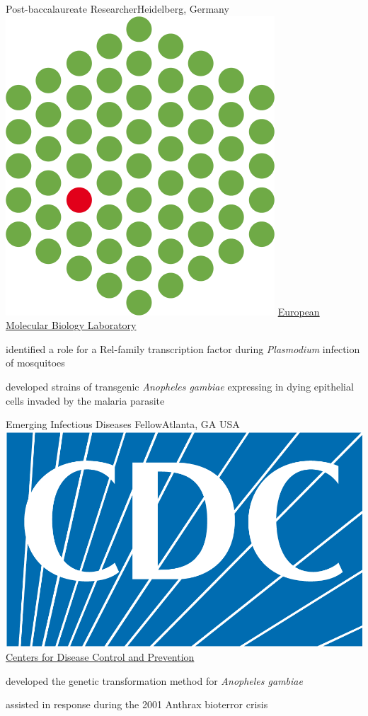 \documentclass[letterpaper]{twentysecond-charactersheet}
\begin{document}
%
	{Post-baccalaureate Researcher}{Heidelberg, Germany}%
	{\includegraphics[width=\logowidth]{img/EMBL.png}}%
	{\href{http://www.embl.de/}{European Molecular Biology Laboratory}}%
	{\begin{itemize}
			{\item[\color{gold}\faStar] identified a role for a Rel-family transcription factor during \emph{Plasmodium} infection of mosquitoes}
		\end{itemize}
		\begin{itemize}
			{\item developed strains of transgenic \emph{Anopheles gambiae} expressing  in dying epithelial cells invaded by the malaria parasite}
		\end{itemize}
	}

	{Emerging Infectious Diseases Fellow}{Atlanta, GA USA}
	{\includegraphics[width=\logowidth]{img/CDC.png}}%
	{\href{http://www.cdc.gov/}{Centers for Disease Control and Prevention}}
	{\begin{itemize}
			{\item[\color{gold-metallic}\faTrophy] developed the genetic transformation method for \emph{Anopheles gambiae}}
		\end{itemize}
		\begin{itemize}
			{\item assisted in  response during the 2001 Anthrax bioterror crisis}
		\end{itemize}
	}
\end{document}
